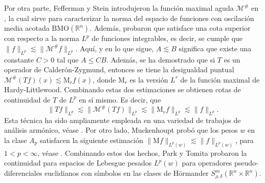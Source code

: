  Por otra parte, Fefferman y Stein introdujeron la función maximal aguda $\mathcal{M}^\#$ en \cite{fefferman-stein}, la cual sirve para caracterizar la norma del espacio de funciones con oscilación media acotada $\mathrm{BMO}(\mathbb{R}^n)$. Además, probaron que satisface una cota superior con respecto a la norma $L^p$ de funciones integrables, es decir, se cumple que $\|f\|_{L^p} \lesssim \|\mathcal{M}^\#f\|_{L^p}$. Aquí, y en lo que sigue, $A\lesssim B$ significa que existe una constante $C>0$ tal que $A\leq CB$. Además, se ha demostrado que si $T$ es un operador de Calderón-Zygmund, entonces se tiene la desigualdad puntual $\mathcal{M}^\#(Tf)(x) \lesssim \mathrm{M}_rf(x)$, donde $\mathrm{M}_r$ es la versión $L^r$ de la función maximal de Hardy-Littlewood. Combinando estas dos estimaciones se obtienen cotas de continuidad de $T$ de $L^p$ en sí mismo. Es decir, que
\begin{equation}
	\|Tf\|_{L^p} \lesssim\|\mathcal{M}^\#(Tf)\|_{L^p} \lesssim\| \mathrm{M}_rf\|_{L^p} \lesssim \|f\|_{L^p}.
	\label{eq:technique}
\end{equation}
Esta técnica ha sido ampliamente empleada en una variedad de trabajos de análisis armónico, véase \cite{fefferman-stein}. Por otro lado, Muckenhoupt probó que los pesos $w$ en la clase $A_p$ satisfacen la siguiente estimación $\|\mathrm{M}f\|_{L^p(w)} \lesssim \| f\|_{L^p(w)}$, para $1<p<\infty$, véase \cite{muckenhoupt}. Combinando estos dos hechos, Park y Tomita \cite{park-tomita} probaron la continuidad para espacios de Lebesgue pesados $L^p(w)$ para operadores pseudo-diferenciales euclidianos con símbolos en las clases de Hörmander $S^{m}_{\rho,\delta} (\mathbb{R}^n\times \mathbb{R}^n)$.

